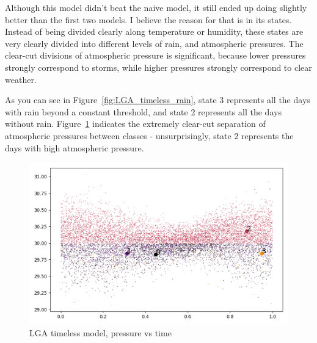 \documentclass[a4paper]{article}
\begin{document}
Although this model didn't beat the naive model, it still ended up doing slightly better than the first two models. I believe the reason for that is in its states. Instead of being divided clearly along temperature or humidity, these states are very clearly divided into different levels of rain, and atmospheric pressures. The clear-cut divisions of atmospheric pressure is significant, because lower pressures strongly correspond to storms, while higher pressures strongly correspond to clear weather. 

As you can see in Figure~\ref{fig:LGA_timeless_rain}, state 3 represents all the days with rain beyond a constant threshold, and state 2 represents all the days without rain. Figure~\ref{fig:LGA_timeless_pressure} indicates the extremely clear-cut separation of atmospheric pressures between classes - unsurprisingly, state 2 represents the days with high atmospheric pressure.


\begin{figure}[t]
  \centering
  \includegraphics[width=\linewidth]{../png/models/LGA-timeless-pressure4.png}
  \caption{LGA timeless model, pressure vs time}
  \label{fig:LGA_timeless_pressure}
\end{figure}
\end{document}
